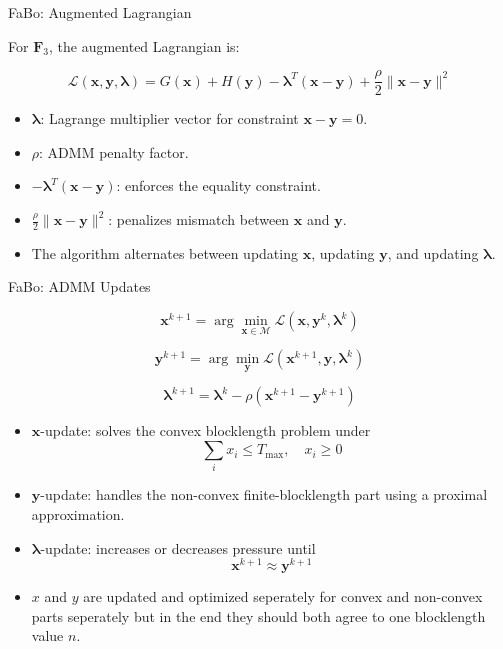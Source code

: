 \documentclass{beamer}
\begin{document}
\begin{frame}{FaBo: Augmented Lagrangian}
\small

For $\mathbf{F}_3$, the augmented Lagrangian is:

\[
\mathcal{L}(\mathbf{x},\mathbf{y},\boldsymbol{\lambda})
=
G(\mathbf{x})
+
H(\mathbf{y})
-
\boldsymbol{\lambda}^{T}(\mathbf{x}-\mathbf{y})
+
\frac{\rho}{2}
\|\mathbf{x}-\mathbf{y}\|^2
\]

\begin{itemize}
    \item $\boldsymbol{\lambda}$: Lagrange multiplier vector for constraint $\mathbf{x}-\mathbf{y}=0$.
    \item $\rho$: ADMM penalty factor.
    \item $-\boldsymbol{\lambda}^{T}(\mathbf{x}-\mathbf{y})$: enforces the equality constraint.
    \item $\frac{\rho}{2}\|\mathbf{x}-\mathbf{y}\|^2$: penalizes mismatch between $\mathbf{x}$ and $\mathbf{y}$.
    \item The algorithm alternates between updating $\mathbf{x}$, updating $\mathbf{y}$, and updating $\boldsymbol{\lambda}$.
\end{itemize}

\end{frame}

\begin{frame}{FaBo: ADMM Updates}
\small

\[
\mathbf{x}^{k+1}
=
\arg\min_{\mathbf{x}\in\mathcal{M}}
\mathcal{L}(\mathbf{x},\mathbf{y}^{k},\boldsymbol{\lambda}^{k})
\]

\[
\mathbf{y}^{k+1}
=
\arg\min_{\mathbf{y}}
\mathcal{L}(\mathbf{x}^{k+1},\mathbf{y},\boldsymbol{\lambda}^{k})
\]

\[
\boldsymbol{\lambda}^{k+1}
=
\boldsymbol{\lambda}^{k}
-
\rho(\mathbf{x}^{k+1}-\mathbf{y}^{k+1})
\]

\begin{itemize}
    \item $\mathbf{x}$-update: solves the convex blocklength problem under
    \[
    \sum_i x_i\leq T_{\max},\quad x_i\geq0
    \]

    \item $\mathbf{y}$-update: handles the non-convex finite-blocklength part using a proximal approximation.

    \item $\boldsymbol{\lambda}$-update: increases or decreases pressure until
    \[
    \mathbf{x}^{k+1}\approx\mathbf{y}^{k+1}
    \]

    \item $x$ and $y$ are updated and optimized seperately for convex and non-convex parts seperately but in the end they should both agree to one blocklength value $n$.
\end{itemize}

\end{frame}
\end{document}
